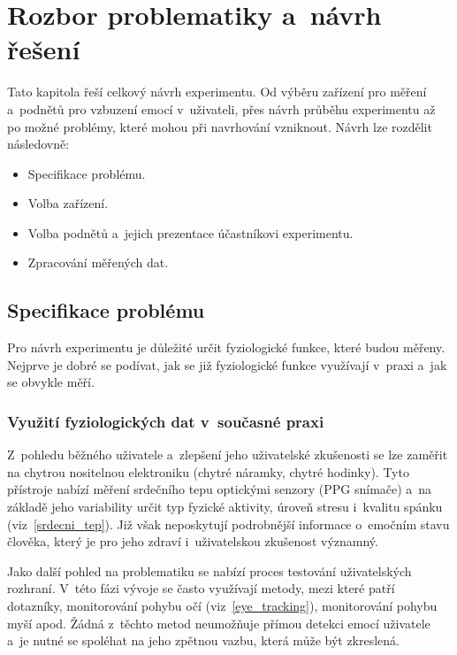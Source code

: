 
\pagebreak

\chapter{Rozbor problematiky a~návrh řešení}
\label{navrh}
    Tato kapitola řeší celkový návrh experimentu. Od výběru zařízení pro měření a~podnětů pro vzbuzení emocí v~uživateli, přes návrh průběhu experimentu až po možné problémy, které mohou při navrhování vzniknout. Návrh lze rozdělit následovně: 
    \begin{itemize}
        \item Specifikace problému.
        \item Volba zařízení.
        \item Volba podnětů a~jejich prezentace účastníkovi experimentu.
        \item Zpracování měřených dat.
    \end{itemize}

    \section{Specifikace problému}
    \label{specifikace_problemu}
    Pro návrh experimentu je důležité určit fyziologické funkce, které budou měřeny. Nejprve je dobré se podívat, jak se již fyziologické funkce využívají v~praxi a~jak se obvykle měří. 
    
    \subsection{Využití fyziologických dat v~současné praxi}
    Z~pohledu běžného uživatele a~zlepšení jeho uživatelské zkušenosti se lze zaměřit na chytrou nositelnou elektroniku (chytré náramky, chytré hodinky). Tyto přístroje nabízí měření srdečního tepu optickými senzory (PPG snímače) a~na základě jeho variability určit typ fyzické aktivity, úroveň stresu i~kvalitu spánku (viz~\ref{srdecni_tep}). Již však neposkytují podrobnější informace o~emočním stavu člověka, který je pro jeho zdraví i~uživatelskou zkušenost významný.
    
    Jako další pohled na problematiku se nabízí proces testování uživatelských rozhraní. V~této fázi vývoje se často využívají metody, mezi které patří dotazníky, monitorování pohybu očí (viz~\ref{eye_tracking}), monitorování pohybu myší apod. Žádná z~těchto metod neumožňuje přímou detekci emocí uživatele a~je nutné se spoléhat na jeho zpětnou vazbu, která může být zkreslená.
    
